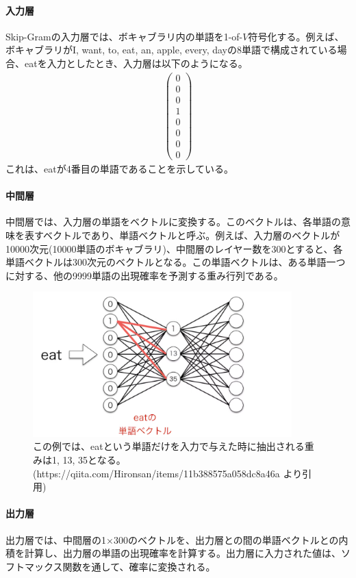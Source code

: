 \documentclass{ltjsarticle}
\begin{document}
\paragraph{入力層}
Skip-Gramの入力層では、ボキャブラリ内の単語を1-of-$V$符号化する。例えば、ボキャブラリがI, want, to, eat, an, apple, every, dayの8単語で構成されている場合、eatを入力としたとき、入力層は以下のようになる。
\begin{align}
  \begin{pmatrix}
    0\\
    0\\
    0\\
    1\\
    0\\
    0\\
    0\\
    0
  \end{pmatrix}
\end{align}
これは、eatが4番目の単語であることを示している。

\paragraph{中間層}
中間層では、入力層の単語をベクトルに変換する。このベクトルは、各単語の意味を表すベクトルであり、単語ベクトルと呼ぶ。例えば、入力層のベクトルが10000次元(10000単語のボキャブラリ)、中間層のレイヤー数を300とすると、各単語ベクトルは300次元のベクトルとなる。この単語ベクトルは、ある単語一つに対する、他の9999単語の出現確率を予測する重み行列である。

\begin{figure}[htbp]
  \centering
  \includegraphics[width=10cm]{./capture/Skip-gram_2.png}
  \caption{この例では、eatという単語だけを入力で与えた時に抽出される重みは1, 13, 35となる。 (https://qiita.com/Hironsan/items/11b388575a058dc8a46a より引用)}
  \label{fig:Skip-gram_2}
\end{figure}

\paragraph{出力層}
出力層では、中間層の1×300のベクトルを、出力層との間の単語ベクトルとの内積を計算し、出力層の単語の出現確率を計算する。出力層に入力された値は、ソフトマックス関数を通して、確率に変換される。
\end{document}
